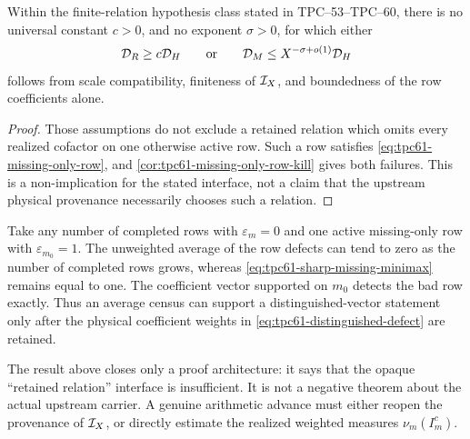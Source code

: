 \begin{proposition}
\label{prop:tpc61-interface-insufficiency}
Within the finite-relation hypothesis class stated in
TPC--53--TPC--60, there is no universal constant \(c>0\), and no exponent
\(\sigma>0\), for which either
\begin{equation}
 \mathcal D_R\ge c\mathcal D_H
 \qquad\text{or}\qquad
 \mathcal D_M\le X^{-\sigma+o(1)}\mathcal D_H
 \label{eq:tpc61-unavailable-uniform-conclusions}
\end{equation}
follows from scale compatibility, finiteness of \(\mathcal I_X\), and boundedness
of the row coefficients alone.
\end{proposition}

\begin{proof}
Those assumptions do not exclude a retained relation which omits every
realized cofactor on one otherwise active row.  Such a row satisfies
\eqref{eq:tpc61-missing-only-row}, and
\cref{cor:tpc61-missing-only-row-kill} gives both failures.  This is a
non-implication for the stated interface, not a claim that the upstream
physical provenance necessarily chooses such a relation.
\end{proof}

\begin{example}
\label{ex:tpc61-average-row-trap}
Take any number of completed rows with \(\varepsilon_m=0\) and one active
missing-only row with \(\varepsilon_{m_0}=1\).  The unweighted average of
the row defects can tend to zero as the number of completed rows grows,
whereas \eqref{eq:tpc61-sharp-missing-minimax} remains equal to one.
The coefficient vector supported on \(m_0\) detects the bad row exactly.
Thus an average census can support a distinguished-vector statement only
after the physical coefficient weights in
\eqref{eq:tpc61-distinguished-defect} are retained.
\end{example}

The result above closes only a proof architecture: it says that the opaque
``retained relation'' interface is insufficient.  It is not a negative
theorem about the actual upstream carrier.  A genuine arithmetic advance
must either reopen the provenance of \(\mathcal I_X\), or directly estimate the
realized weighted measures \(\nu_m(I_m^c)\).
